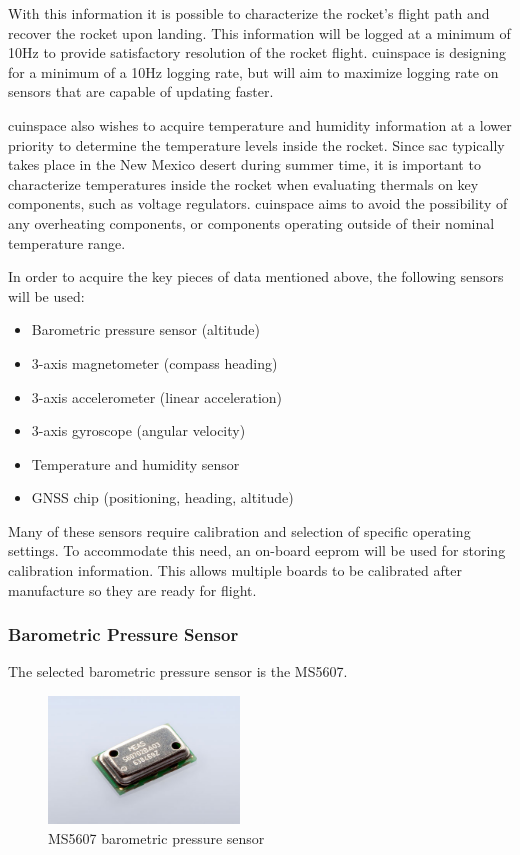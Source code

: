 With this information it is possible to characterize the rocket's flight path and recover the rocket upon landing. This
information will be logged at a minimum of 10Hz to provide satisfactory resolution of the rocket flight.
\gls{cuinspace} is designing for a minimum of a 10Hz logging rate, but will aim to maximize logging rate on sensors
that are capable of updating faster.

\Gls{cuinspace} also wishes to acquire temperature and humidity information at a lower priority to determine the
temperature levels inside the rocket. Since \gls{sac} typically takes place in the New Mexico desert during summer time,
it is important to characterize temperatures inside the rocket when evaluating thermals on key components, such as
voltage regulators. \Gls{cuinspace} aims to avoid the possibility of any overheating components, or components operating
outside of their nominal temperature range.

In order to acquire the key pieces of data mentioned above, the following sensors will be used:

\begin{itemize}
    \item Barometric pressure sensor (altitude)
    \item 3-axis magnetometer (compass heading)
    \item 3-axis accelerometer (linear acceleration)
    \item 3-axis gyroscope (angular velocity)
    \item Temperature and humidity sensor
    \item GNSS chip (positioning, heading, altitude)
\end{itemize}

Many of these sensors require calibration and selection of specific operating settings. To accommodate this need, an
on-board \gls{eeprom} will be used for storing calibration information. This allows multiple boards to be calibrated
after manufacture so they are ready for flight.

\subsubsection{Barometric Pressure Sensor}

The selected barometric pressure sensor is the MS5607.

\begin{figure}[H]
    \centering
    \includegraphics[width=2in]{assets/images/ms5607.jpg}
    \caption{MS5607 barometric pressure sensor \cite{ms5607-pic}}
\end{figure}

